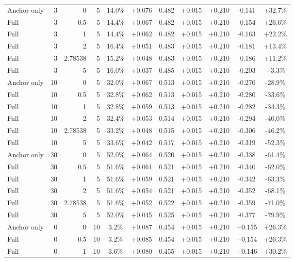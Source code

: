 \begin{table}[htbp]
\begin{tabular}{lrrrccccccc}
Anchor only & 3 & 0 & 5 & 14.0\% & +0.076 & 0.482 & +0.015 & +0.210 & -0.141 & +32.7\% \\
Full & 3 & 0.5 & 5 & 14.4\% & +0.067 & 0.482 & +0.015 & +0.210 & -0.154 & +26.6\% \\
Full & 3 & 1 & 5 & 14.4\% & +0.062 & 0.482 & +0.015 & +0.210 & -0.163 & +22.2\% \\
Full & 3 & 2 & 5 & 16.4\% & +0.051 & 0.483 & +0.015 & +0.210 & -0.181 & +13.4\% \\
Full & 3 & 2.78538 & 5 & 15.2\% & +0.048 & 0.483 & +0.015 & +0.210 & -0.186 & +11.2\% \\
Full & 3 & 5 & 5 & 16.0\% & +0.037 & 0.485 & +0.015 & +0.210 & -0.203 & +3.3\% \\
Anchor only & 10 & 0 & 5 & 32.0\% & +0.067 & 0.513 & +0.015 & +0.210 & -0.270 & -28.9\% \\
Full & 10 & 0.5 & 5 & 32.8\% & +0.062 & 0.513 & +0.015 & +0.210 & -0.280 & -33.6\% \\
Full & 10 & 1 & 5 & 32.8\% & +0.059 & 0.513 & +0.015 & +0.210 & -0.282 & -34.3\% \\
Full & 10 & 2 & 5 & 32.4\% & +0.053 & 0.514 & +0.015 & +0.210 & -0.294 & -40.0\% \\
Full & 10 & 2.78538 & 5 & 33.2\% & +0.048 & 0.515 & +0.015 & +0.210 & -0.306 & -46.2\% \\
Full & 10 & 5 & 5 & 33.6\% & +0.042 & 0.517 & +0.015 & +0.210 & -0.319 & -52.3\% \\
Anchor only & 30 & 0 & 5 & 52.0\% & +0.064 & 0.520 & +0.015 & +0.210 & -0.338 & -61.4\% \\
Full & 30 & 0.5 & 5 & 51.6\% & +0.061 & 0.521 & +0.015 & +0.210 & -0.340 & -62.0\% \\
Full & 30 & 1 & 5 & 51.6\% & +0.059 & 0.521 & +0.015 & +0.210 & -0.342 & -63.3\% \\
Full & 30 & 2 & 5 & 51.6\% & +0.054 & 0.521 & +0.015 & +0.210 & -0.352 & -68.1\% \\
Full & 30 & 2.78538 & 5 & 51.6\% & +0.052 & 0.522 & +0.015 & +0.210 & -0.359 & -71.0\% \\
Full & 30 & 5 & 5 & 52.0\% & +0.045 & 0.525 & +0.015 & +0.210 & -0.377 & -79.9\% \\
Anchor only & 0 & 0 & 10 & 3.2\% & +0.087 & 0.454 & +0.015 & +0.210 & +0.155 & +26.3\% \\
Full & 0 & 0.5 & 10 & 3.2\% & +0.085 & 0.454 & +0.015 & +0.210 & +0.154 & +26.3\% \\
Full & 0 & 1 & 10 & 3.6\% & +0.080 & 0.455 & +0.015 & +0.210 & +0.146 & +30.2\% \\

\end{tabular}
\end{table}
